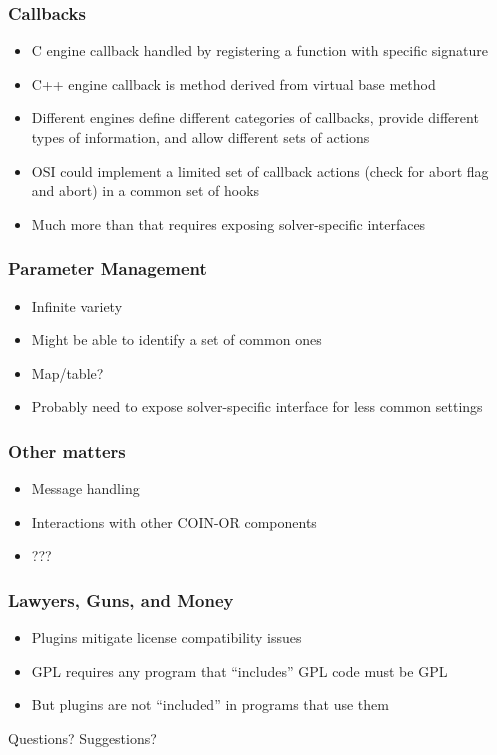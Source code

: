 \documentclass{beamer}
\begin{document}
\begin{frame}
  \frametitle{Callbacks}

  \begin{itemize}
  \item C engine callback handled by registering a function with
    specific signature
  \item C++ engine callback is method derived from virtual base
    method
  \item Different engines define different categories of callbacks,
    provide different types of information, and allow different sets
    of actions
  \item OSI could implement a limited set of callback actions (check
    for abort flag and abort) in a common set of hooks
  \item Much more than that requires exposing solver-specific interfaces
  \end{itemize}
\end{frame}

\begin{frame}
  \frametitle{Parameter Management}

  \begin{itemize}
  \item Infinite variety
  \item Might be able to identify a set of common ones
  \item Map/table?
  \item Probably need to expose solver-specific interface for less
    common settings
  \end{itemize}
\end{frame}

\begin{frame}
  \frametitle{Other matters}

  \begin{itemize}
  \item Message handling
  \item Interactions with other COIN-OR components
  \item ???
  \end{itemize}
\end{frame}

\begin{frame}
  \frametitle{Lawyers, Guns, and Money}

  \begin{itemize}
  \item Plugins mitigate license compatibility issues
  \item GPL requires any program that ``includes'' GPL code must be GPL
  \item But plugins are not ``included'' in programs that use them
  \end{itemize}

\end{frame}

\begin{frame}
  \begin{center}
    Questions?  Suggestions?
  \end{center}
\end{frame}
\end{document}
